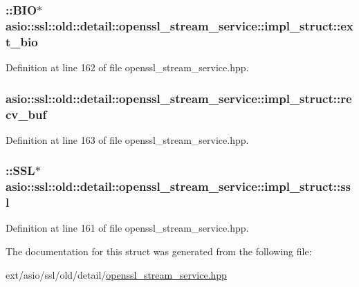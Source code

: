 \subsubsection[{ext\+\_\+bio}]{\setlength{\rightskip}{0pt plus 5cm}\+::B\+I\+O$\ast$ asio\+::ssl\+::old\+::detail\+::openssl\+\_\+stream\+\_\+service\+::impl\+\_\+struct\+::ext\+\_\+bio}\label{structasio_1_1ssl_1_1old_1_1detail_1_1openssl__stream__service_1_1impl__struct_a46c549183817ecbcab44247ee813c21b}


Definition at line 162 of file openssl\+\_\+stream\+\_\+service.\+hpp.

\hypertarget{structasio_1_1ssl_1_1old_1_1detail_1_1openssl__stream__service_1_1impl__struct_aa23375c5983d48ca327f4052537e39f8}{}
\subsubsection[{recv\+\_\+buf}]{ asio\+::ssl\+::old\+::detail\+::openssl\+\_\+stream\+\_\+service\+::impl\+\_\+struct\+::recv\+\_\+buf}\label{structasio_1_1ssl_1_1old_1_1detail_1_1openssl__stream__service_1_1impl__struct_aa23375c5983d48ca327f4052537e39f8}


Definition at line 163 of file openssl\+\_\+stream\+\_\+service.\+hpp.

\hypertarget{structasio_1_1ssl_1_1old_1_1detail_1_1openssl__stream__service_1_1impl__struct_ad80b27797dc8f5aa013dc54add0153f7}{}
\subsubsection[{ssl}]{\setlength{\rightskip}{0pt plus 5cm}\+::S\+S\+L$\ast$ asio\+::ssl\+::old\+::detail\+::openssl\+\_\+stream\+\_\+service\+::impl\+\_\+struct\+::ssl}\label{structasio_1_1ssl_1_1old_1_1detail_1_1openssl__stream__service_1_1impl__struct_ad80b27797dc8f5aa013dc54add0153f7}


Definition at line 161 of file openssl\+\_\+stream\+\_\+service.\+hpp.



The documentation for this struct was generated from the following file\+:\begin{DoxyCompactItemize}
\item 
ext/asio/ssl/old/detail/\hyperlink{openssl__stream__service_8hpp}{openssl\+\_\+stream\+\_\+service.\+hpp}\end{DoxyCompactItemize}
